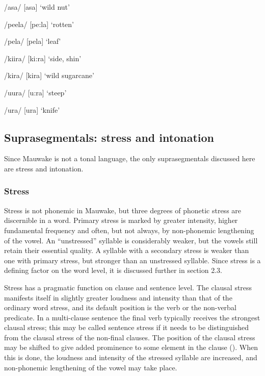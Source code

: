 /asa/  [a{{\textprimstress}sa}]  `wild  nut'

/peela/  [{{\textprimstress}pe:la}]  `rotten'

/pela/  [pe{{\textprimstress}la}]  `leaf'

/kiira/  [{{\textprimstress}ki:r}a]  `side, shin'

/kira/  [ki{{\textprimstress}ra}]  `wild sugarcane'

/{\textphi}uura/  [{{\textprimstress}}{\textphi}u:ra]  `steep'

/{\textphi}ura/  [{\textphi}u{{\textprimstress}ra}]  `knife'

\subsection{Suprasegmentals: stress and intonation}


Since Mauwake is not a tonal language, the only suprasegmentals discussed here are stress and intonation.

\subsubsection{Stress}


Stress is not phonemic in Mauwake, but three degrees of phonetic stress are discernible in a word.  Primary stress is marked by greater intensity, higher fundamental frequency and often, but not always, by non-phonemic lengthening of the vowel.  An ``unstressed'' syllable is considerably weaker, but the vowels still retain their essential quality.  A syllable with a secondary stress is weaker than one with primary stress, but stronger than an unstressed syllable. Since stress is a defining factor on the word level, it is discussed further in section 2.3.

Stress has a pragmatic function on clause and sentence level. The clausal stress manifests itself in slightly greater loudness and intensity than that of the ordinary word stress, and its default position is the verb or the non-verbal predicate. In a multi-clause sentence the final verb typically receives the strongest clausal stress; this may be called sentence stress if it needs to be distinguished from the clausal stress of the non-final clauses. The position of the clausal stress may be shifted to give added prominence to some element in the clause (). When this is done, the loudness and intensity of the stressed syllable are increased, and non-phonemic lengthening of the vowel may take place.

